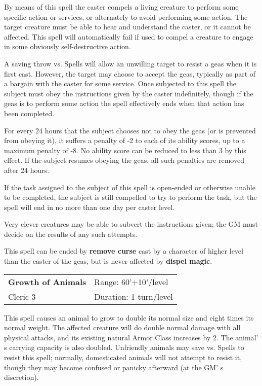 \documentclass[a4paper,twoside,openany,10pt]{book}
\begin{document}
\begin{multicols}{2}
By means of this spell the caster compels a living creature to perform some specific action or services, or alternately to avoid performing some action. The target creature must be able to hear and understand the caster, or it cannot be affected. This spell will automatically fail if used to compel a creature to engage in some obviously self-destructive action.

A saving throw vs. Spells will allow an unwilling target to resist a geas when it is first cast. However, the target may choose to accept the geas, typically as part of a bargain with the caster for some service. Once subjected to this spell the subject must obey the instructions given by the caster indefinitely, though if the geas is to perform some action the spell effectively ends when that action has been completed.

For every 24 hours that the subject chooses not to obey the geas (or is prevented from obeying it), it suffers a penalty of -2 to each of its ability scores, up to a maximum penalty of -8. No ability score can be reduced to less than 3 by this effect. If the subject resumes obeying the geas, all such penalties are removed after 24 hours.

If the task assigned to the subject of this spell is open-ended or otherwise unable to be completed, the subject is still compelled to try to perform the task, but the spell will end in no more than one day per caster level.

Very clever creatures may be able to subvert the instructions given; the GM must decide on the results of any such attempts.

This spell can be ended by \textbf{remove curse} cast by a character of higher level than the caster of the geas, but is never affected by \textbf{dispel magic}.


\smallskip\begin{flushleft} 
	\begin{tabularx}{0.45\textwidth}{@{}m{3.5cm}m{5.5cm}@{}} 
		\textbf{Growth of Animals} & Range: 60'+10'/level\\
Cleric 3 & Duration: 1 turn/level\\
	\end{tabularx}\end{flushleft}

This spell causes an animal to grow to double its normal size and eight times its normal weight. The affected creature will do double normal damage with all physical attacks, and its existing natural Armor Class increases by 2. The animal' s carrying capacity is also doubled. Unfriendly animals may save vs. Spells to resist this spell; normally, domesticated animals will not attempt to resist it, though they may become confused or panicky afterward (at the GM' s discretion).


\end{multicols}
\end{document}
